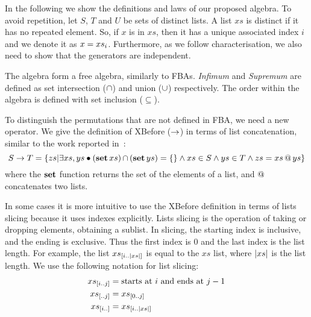 \documentclass[en,twoside,onehalfspacing,phd]{risethesis}
\makeatletter
\newcommand{\sliceright}[2]{\ensuremath #1_{\left[..#2\right]}}
\newcommand{\sliceleft}[2]{\ensuremath #1_{\left[#2..\right]}}
\newcommand{\slice}[3]{\ensuremath #1_{\left[#2..#3\right]}}
\def\xbeforeop{\ensuremath\rightarrow}
\newcommand{\xbefore}[2]{\ensuremath #1 \xbeforeop #2 }
\newcommand{\nth}[2]{\ensuremath #1_{#2}}
\newcommand{\length}[1]{\ensuremath\left|#1\right|}
\newcommand{\append}[2]{\ensuremath #1 \operatorname{\mathbf{@}} #2}
\def\listsetop{\ensuremath\operatorname{\mathbf{set}}}
\newcommand{\listset}[1]{\ensuremath\listsetop #1}
\def\algebraset{\ensuremath\operatorname{\mathbf{atf}}}
\newcommand{\setsin}[1]{\ensuremath\left\{ #1 \right\}}
\newcommand{\parsin}[1]{\ensuremath\left( #1 \right)}
\def\union{\ensuremath\operatorname{\cup}}
\def\inter{\ensuremath\operatorname{\cap}}
\makeatother
\begin{document}


In the following we show the definitions and laws of our proposed \ac{algebra}.
To avoid repetition, let $S$, $T$ and $U$ be sets of distinct lists.
A list $xs$ is distinct if it has no repeated element.
So, if $x$ is in $xs$, then it has a unique associated index $i$ and we denote it as $x = \nth{xs}{i}$.
Furthermore, as we follow  characterisation, we also need to show that the generators are independent.

The \ac{algebra} form a free algebra, similarly to \acp{FBA}.
\emph{Infimum} and \emph{Supremum} are defined as set intersection ($\inter$) and union ($\union$) respectively.
The order within the algebra is defined with set inclusion ($\subseteq$).

To distinguish the permutations that are not defined in \ac{FBA}, we need a new operator.
We give the definition of XBefore ($\xbeforeop$) in terms of list concatenation, similar to the work reported in~\cite{DM2015}:
%
\begin{equation}
\label{def:xbefore-append}
\xbefore{S}{T} =
  \setsin{
    zs | \exists xs, ys \bullet \parsin{\listset{xs}} \inter \parsin{\listset{ys}} = \{\}
      \land xs \in S \land ys \in T \land zs = \append{xs}{ys}
  }
\end{equation}
%
where the $\listset{}$ function returns the set of the elements of a list, and $\append{}{}$ concatenates two lists.

In some cases it is more intuitive to use the XBefore definition in terms of lists slicing because it uses indexes explicitly.
Lists slicing is the operation of taking or dropping elements, obtaining a sublist.
In slicing, the starting index is inclusive, and the ending is exclusive.
Thus the first index is 0 and the last index is the list length.
For example, the list $\slice{xs}{i}{\length{xs}}$ is equal to the $xs$ list, where $\length{xs}$ is the list length.
We use the following notation for list slicing:
%
\begin{subequations}
\begin{align}
\slice{xs}{i}{j} &= \text{starts at $i$ and ends at $j-1$}\\
\sliceright{xs}{j} &= \slice{xs}{0}{j}\\
\sliceleft{xs}{i} &= \slice{xs}{i}{\length{xs}}
\end{align}
\end{subequations}
\end{document}
